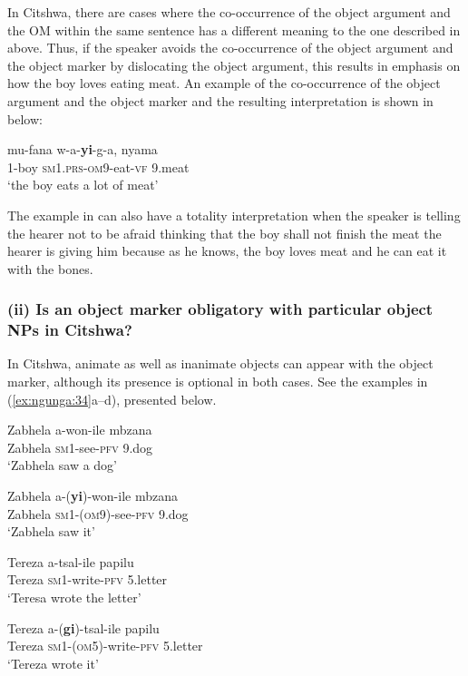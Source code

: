 \documentclass[output=paper]{langscibook}
\begin{document}
In Citshwa, there are cases where the co-occurrence of the object argument and the OM within the same sentence has a different meaning to the one described in  above. Thus, if the speaker avoids the co-occurrence of the object argument and the object marker by dislocating the object argument, this results in emphasis on how the boy loves eating meat. An example of the co-occurrence of the object argument and the object marker and the resulting interpretation is shown in  below:

\ea\label{ex:ngunga:33}
\gll mu-fana   w-a-\textbf{yi}{}-g-a,    nyama\\
1-boy    {\textsc{sm1}.\textsc{prs}}{}-{\textsc{om}9}{}-eat-\textsc{vf}  9.meat  \\
\glt ‘the boy eats a lot of meat’
\z

The example in  can also have a totality interpretation when the speaker is telling the hearer not to be afraid thinking that the boy shall not finish the meat the hearer is  giving him because as he knows, the boy loves meat and he can eat it with the bones. 

\subsubsection{(ii) Is an object marker obligatory with particular object NPs in Citshwa?}

  In Citshwa, animate as well as inanimate objects can appear with the object marker, although its presence is optional in both cases. See the examples in (\ref{ex:ngunga:34}a--d), presented below.

\ea\label{ex:ngunga:34}
\ea\label{ex:ngunga:34a} \gll Zabhela  a-won-ile    mbzana\\
Zabhela  {\textsc{sm1}}{}-see-{\textsc{pfv}}    9.dog\\
\glt ‘Zabhela saw a dog’ 

\ex\label{ex:ngunga:34b} \gll Zabhela  a-(\textbf{yi})-won-ile    mbzana\\
Zabhela  \textsc{sm1}-({\textsc{om}9}){}-see-{\textsc{pfv}}  9.dog\\
\glt ‘Zabhela saw it’ 

\ex\label{ex:ngunga:34c} \gll Tereza    a-tsal-ile    papilu\\
Tereza    \textsc{sm1}-write-\textsc{pfv}    5.letter\\
\glt ‘Teresa wrote the letter’

\ex\label{ex:ngunga:34d} \gll Tereza    a-(\textbf{gi})-tsal-ile    papilu\\
Tereza    \textsc{sm1}-({\textsc{om}5}){}-write-{\textsc{pfv}}  5.letter\\
\glt ‘Tereza wrote it’
\z
\z
\end{document}
